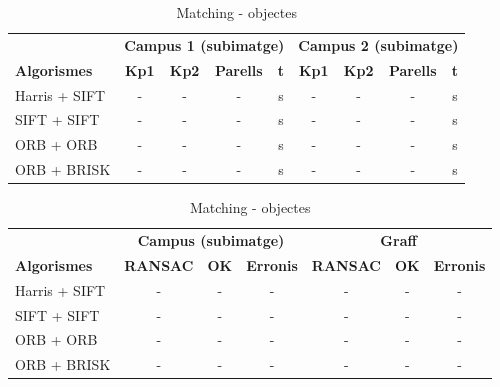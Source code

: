 		\begin{table}[H]
			\begin{center}
				\begin{tabular}{l | c c c c | c c c c}
					& \multicolumn{4}{c|}{\textbf{Campus 1 (subimatge)}} & \multicolumn{4}{c}{\textbf{Campus 2 (subimatge)}} \\
					\textbf{Algorismes} & \textbf{Kp1} & \textbf{Kp2} & \textbf{Parells} & \textbf{t} & \textbf{Kp1} & \textbf{Kp2} & \textbf{Parells} & \textbf{t} \\ \hline
					Harris + SIFT & - & - & - & s & - & - & - & s \\
					SIFT + SIFT & - & - & - & s & - & - & - & s \\
					ORB + ORB & - & - & - & s & - & - & - & s \\
					ORB + BRISK & - & - & - & s & - & - & - & s \\
				\end{tabular}
			\end{center}
			\caption{Matching - objectes}
		\end{table}

		\begin{table}[H]
			\begin{center}
				\begin{tabular}{l | c c c | c c c}
					& \multicolumn{3}{c|}{\textbf{Campus (subimatge)}} & \multicolumn{3}{c}{\textbf{Graff}} \\
					\textbf{Algorismes} & \textbf{RANSAC} & \textbf{OK} & \textbf{Erronis} & \textbf{RANSAC} & \textbf{OK} & \textbf{Erronis} \\ \hline
					Harris + SIFT & - & - & - & - & - & - \\
					SIFT + SIFT & - & - & - & - & - & - \\
					ORB + ORB & - & - & - & - & - & - \\
					ORB + BRISK & - & - & - & - & - & - \\
				\end{tabular}
			\end{center}
			\caption{Matching - objectes}
		\end{table}
		\noindent


